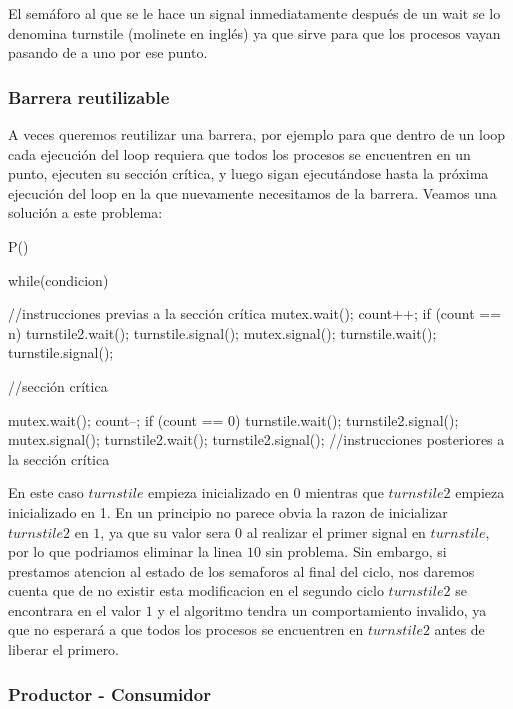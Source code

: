 \documentclass{article}
\begin{document}
El sem\'aforo al que se le hace un signal inmediatamente despu\'es de un wait se lo denomina turnstile (molinete en ingl\'es) ya que sirve para que los procesos vayan pasando de a uno por ese punto.

\subsubsection{Barrera reutilizable}

A veces queremos reutilizar una barrera, por ejemplo para que dentro de un loop cada ejecuci\'on del loop requiera que todos los procesos se encuentren en un punto, ejecuten su secci\'on cr\'itica, y luego sigan ejecut\'andose hasta la pr\'oxima ejecuci\'on del loop en la que nuevamente necesitamos de la barrera. Veamos una soluci\'on a este problema:

\begin{code}
P()
{
    while(condicion)
		{
		    //instrucciones previas a la sección crítica
		    mutex.wait();
				    count++;
						if (count == n)
						{
						    turnstile2.wait();
								turnstile.signal();
						}
				mutex.signal();
				turnstile.wait();
				turnstile.signal();
				
				//sección crítica
				
				mutex.wait();
				    count--;
						if (count == 0)
						{
						    turnstile.wait();
								turnstile2.signal();
						}
				mutex.signal();
				turnstile2.wait();
				turnstile2.signal();
				//instrucciones posteriores a la sección crítica
		}
}
\end{code}

En este caso $turnstile$ empieza inicializado en 0 mientras que $turnstile2$ empieza inicializado en 1. En un principio no parece obvia la razon de inicializar $turnstile2$ en $1$, ya que su valor sera $0$ al realizar el primer signal en $turnstile$, por lo que podriamos eliminar la linea $10$ sin problema. Sin embargo, si prestamos atencion al estado de los semaforos al final del ciclo, nos daremos cuenta que de no existir esta modificacion en el segundo ciclo $turnstile2$ se encontrara en el valor $1$ y el algoritmo tendra un comportamiento invalido, ya que no esperará a que todos los procesos se encuentren en $turnstile2$ antes de liberar el primero.

\subsubsection{Productor - Consumidor}
\end{document}
